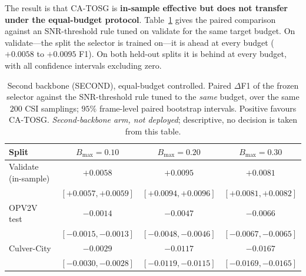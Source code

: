 \documentclass[journal]{IEEEtran}
\newcommand{\method}{CA-TOSG}
\begin{document}
The result is that \method{} is \textbf{in-sample effective but does not transfer under the
equal-budget protocol}. Table~\ref{tab:second_backbone} gives the paired comparison against an
SNR-threshold rule tuned on validate for the same target budget. On validate---the split the selector is trained on---it is ahead
at every budget ($+0.0058$ to $+0.0095$ F1). On both held-out splits it is behind at every budget,
with all confidence intervals excluding zero.

\begin{table}[t]
\centering
\footnotesize
\setlength{\tabcolsep}{3pt}
\caption{Second backbone (SECOND), equal-budget controlled. Paired $\Delta$F1 of the frozen selector
against the SNR-threshold rule tuned to the \emph{same} budget, over the same $200$ CSI samplings;
$95\%$ frame-level paired bootstrap intervals. Positive favours \method{}. \emph{Second-backbone
arm, not deployed}; descriptive, no decision is taken from this table.}
\label{tab:second_backbone}
\begin{tabular}{lccc}
\toprule
Split & $B_{\max}=0.10$ & $B_{\max}=0.20$ & $B_{\max}=0.30$ \\
\midrule
Validate (in-sample) & $+0.0058$ & $+0.0095$ & $+0.0081$ \\
                     & \tiny$[+0.0057,+0.0059]$ & \tiny$[+0.0094,+0.0096]$ & \tiny$[+0.0081,+0.0082]$ \\
OPV2V test           & $-0.0014$ & $-0.0047$ & $-0.0066$ \\
                     & \tiny$[-0.0015,-0.0013]$ & \tiny$[-0.0048,-0.0046]$ & \tiny$[-0.0067,-0.0065]$ \\
Culver-City          & $-0.0029$ & $-0.0117$ & $-0.0167$ \\
                     & \tiny$[-0.0030,-0.0028]$ & \tiny$[-0.0119,-0.0115]$ & \tiny$[-0.0169,-0.0165]$ \\
\bottomrule
\end{tabular}
\end{table}
\end{document}
